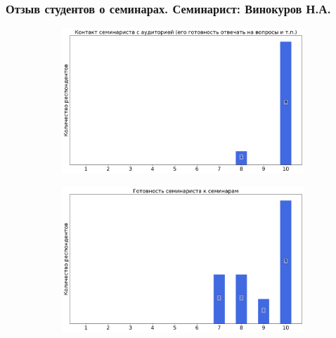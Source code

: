     \subsubsection{Отзыв студентов о семинарах. Семинарист: Винокуров Н.А.}
        \begin{figure}[H]
            \centering
            \begin{subfigure}[b]{0.45\textwidth}
                \centering
                \includegraphics[width=\textwidth]{images/1 course/Информатика/seminarists-marks-Винокуров Н.А.-0.png}
            \end{subfigure}
            \begin{subfigure}[b]{0.45\textwidth}
                \centering
                \includegraphics[width=\textwidth]{images/1 course/Информатика/seminarists-marks-Винокуров Н.А.-1.png}
            \end{subfigure}
            \begin{subfigure}[b]{0.45\textwidth}
                \centering

\end{subfigure}
\end{figure}
